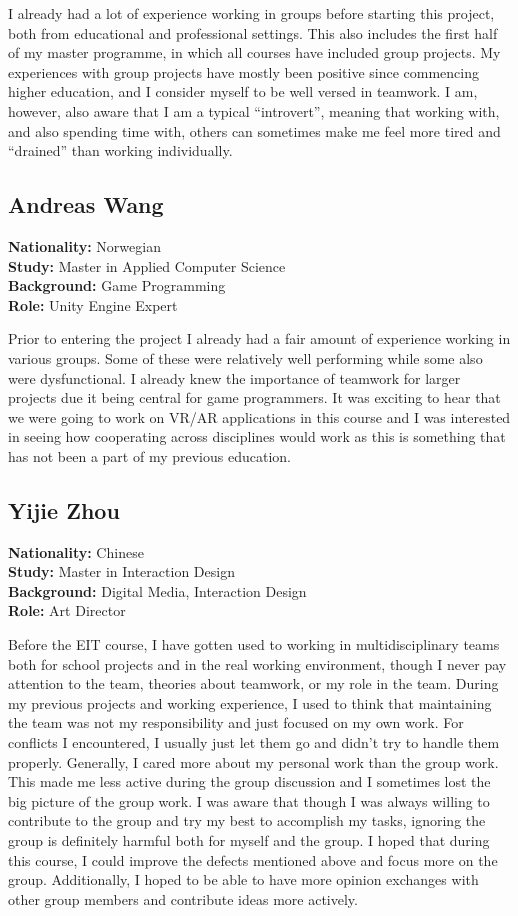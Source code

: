 I already had a lot of experience working in groups before starting this project, both from educational and professional settings. This also includes the first half of my master programme, in which all courses have included group projects. My experiences with group projects have mostly been positive since commencing higher education, and I consider myself to be well versed in teamwork. I am, however, also aware that I am a typical “introvert”, meaning that working with, and also spending time with, others can sometimes make me feel more tired and “drained” than working individually. 


\subsection{Andreas Wang}
\textbf{Nationality:} Norwegian \\
\textbf{Study:} Master in Applied Computer Science \\
\textbf{Background:} Game Programming \\ 
\textbf{Role:} Unity Engine Expert

Prior to entering the project I already had a fair amount of experience working in various groups. Some of these were relatively well performing while some also were dysfunctional. I already knew the importance of teamwork for larger projects due it being central for game programmers. It was exciting to hear that we were going to work on VR/AR applications in this course and I was interested in seeing how cooperating across disciplines would work as this is something that has not been a part of my previous education. 

\subsection{Yijie Zhou}
\textbf{Nationality:} Chinese \\
\textbf{Study:} Master in Interaction Design \\
\textbf{Background:} Digital Media, Interaction Design \\
\textbf{Role:} Art Director

Before the EIT course, I have gotten used to working in multidisciplinary teams both for school projects and in the real working environment, though I never pay attention to the team, theories about teamwork, or my role in the team. During my previous projects and working experience, I used to think that maintaining the team was not my responsibility and just focused on my own work. For conflicts I encountered, I usually just let them go and didn’t try to handle them properly. Generally, I cared more about my personal work than the group work. This made me less active during the group discussion and I sometimes lost the big picture of the group work. I was aware that though I was always willing to contribute to the group and try my best to accomplish my tasks, ignoring the group is definitely harmful both for myself and the group. I hoped that during this course, I could improve the defects mentioned above and focus more on the group. Additionally, I hoped to be able to have more opinion exchanges with other group members and contribute ideas more actively. 
 